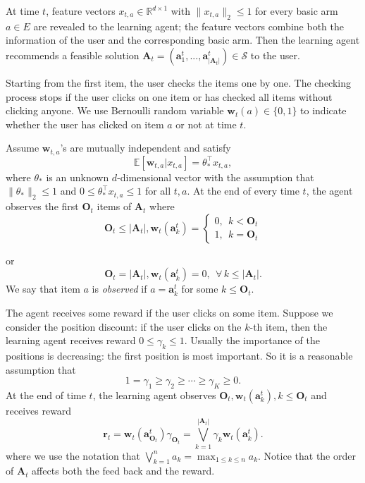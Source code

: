 \documentclass{article}
\newcommand{\EE}{\mathbb{E}}
\newcommand{\RR}{\mathbb{R}}
\newcommand{\bA}{\mathbf{A}}
\newcommand{\ba}{\mathbf{a}}
\newcommand{\bO}{\mathbf{O}}
\newcommand{\br}{\mathbf{r}}
\newcommand{\bw}{\mathbf{w}}
\newcommand{\cS}{\mathcal{S}}
\newcommand{\abs}[1]{\left| #1 \right|}
\newcommand{\norm}[1]{\| #1 \|}
\newcommand{\wei}[1]{}
\newcommand{\wei}[1]{{\color{blue!50!black}  [\text{Wei:} #1]}}
\begin{document}
\wei{We should unify terms, such as agent, user, player, etc. Also I suggest to refer to the agent as she, her.
Also for base arms, should we call them base arms, or items? their outcome as weights, or reward? It is fine to use up to two
terms interchangibly, but if so, we need to say it clearly at the first time the term is referred to.
Otherwise, we stick to one term.}
At time $t$, feature vectors $x_{t,a} \in \RR^{d \times 1}$ with $\norm{x_{t,a}}_2 \leq 1$ for every basic arm $a \in E$ are revealed to the learning agent; the feature vectors combine both the information of the user and the corresponding basic arm. Then the learning agent recommends a feasible solution $\bA_t=(\ba_{1}^t,...,\ba_{\abs{\bA_t}}^t) \in \cS$ to the user. 
\wei{Why using $\ba_{1}^t$, not $a_1^t$?}
Starting from the first item, the user checks the items one by one. The checking process stops if the user clicks on one item or has checked all items without clicking anyone. We use Bernoulli random variable $\bw_{t}(a) \in \{0,1\}$ to indicate whether the user has clicked on item $a$ or not at time $t$. 

Assume $\bw_{t,a}$'s are mutually independent and satisfy
\begin{equation}
\label{eq:expectation}
\EE[\bw_{t,a} | x_{t,a}] = \theta_{\ast}^{\top} x_{t,a},
\end{equation}
where $\theta_{\ast}$ is an unknown $d$-dimensional vector with the assumption that $\norm{\theta_{\ast}}_2 \leq 1$ and $0 \leq \theta_{\ast}^{\top} x_{t,a} \leq 1$ for all $t, a$. At the end of every time $t$, the agent observes the first $\bO_t$ items of $\bA_t$ where 
$$
\bO_t \leq \abs{\bA_t}, \bw_t(\ba_k^t) = \begin{cases} 0, ~~k < \bO_t \\ 1, ~~k = \bO_t \end{cases}
$$ 
\wei{The above definition of $\bO_t$ looks indirect to me. What about "For some $k=1,2,\ldots, |\bA_t|$, $\bO_t = k$
	if for all $j< k$, $\bw_t(\ba_j^t)=0$ and $\bw_t(\ba_k^t)=1$.}
or 
$$
\bO_t = \abs{\bA_t}, \bw_t(\ba_k^t) = 0, ~~ \forall\, k \leq \abs{\bA_t}.
$$
We say that item $a$ is {\it observed} if $a = \ba_k^t$ for some $k \leq \bO_t$. 

The agent receives some reward if the user clicks on some item. Suppose we consider the position discount: if the user clicks on the $k$-th item, then the learning agent receives reward $0 \leq \gamma_k \leq 1$. Usually the importance of the positions is decreasing: the first position is most important. So it is a reasonable assumption that
$$
1 = \gamma_1 \geq \gamma_2 \geq \cdots \geq \gamma_K \geq 0.
$$
At the end of time $t$, the learning agent observes $\bO_t, \bw_t(\ba_k^t), k \leq \bO_t$ and receives reward
$$
\br_t = \bw_t(\ba_{\bO_t}^t) \gamma_{\bO_t} = \bigvee_{k=1}^{\abs{\bA_t}} \gamma_k \bw_t(\ba_k^t).
$$
where we use the notation that $\bigvee_{k=1}^n a_k = \max_{1 \leq k \leq n} a_k$. Notice that the order of $\bA_t$ affects both the feed back and the reward.
\end{document}
